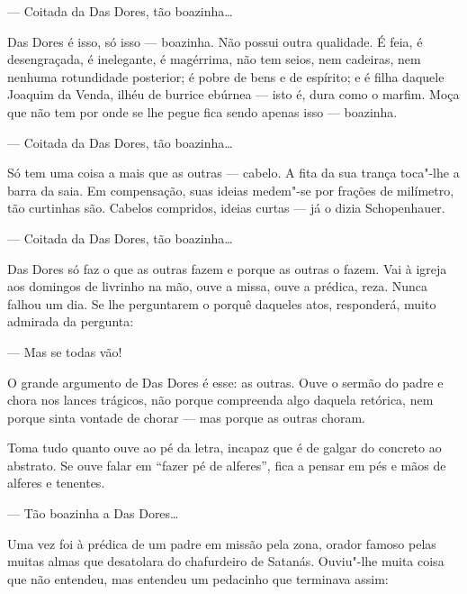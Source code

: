 --- Coitada da Das Dores, tão boazinha\ldots{}

Das Dores é isso, só isso --- boazinha. Não possui outra qualidade. É
feia, é desengraçada, é inelegante, é magérrima, não tem seios, nem
cadeiras, nem nenhuma rotundidade posterior; é pobre de bens e de
espírito; e é filha daquele Joaquim da Venda, ilhéu de burrice ebúrnea
--- isto é, dura como o marfim. Moça que não tem por onde se lhe pegue
fica sendo apenas isso --- boazinha.

--- Coitada da Das Dores, tão boazinha\ldots{}

Só tem uma coisa a mais que as outras --- cabelo. A fita da sua trança
toca"-lhe a barra da saia. Em compensação, suas ideias medem"-se por
frações de milímetro, tão curtinhas são. Cabelos compridos, ideias
curtas --- já o dizia Schopenhauer.


--- Coitada da Das Dores, tão boazinha\ldots{}

Das Dores só faz o que as outras fazem e porque as outras o fazem. Vai à
igreja aos domingos de livrinho na mão, ouve a missa, ouve a prédica,
reza. Nunca falhou um dia. Se lhe perguntarem o porquê daqueles atos,
responderá, muito admirada da pergunta:

--- Mas se todas vão!

O grande argumento de Das Dores é esse: as outras. Ouve o sermão do
padre e chora nos lances trágicos, não porque compreenda algo daquela
retórica, nem porque sinta vontade de chorar --- mas porque as outras
choram.

Toma tudo quanto ouve ao pé da letra, incapaz que é de galgar do
concreto ao abstrato. Se ouve falar em ``fazer pé de alferes'', fica a
pensar em pés e mãos de alferes e tenentes.

--- Tão boazinha a Das Dores\ldots{}

Uma vez foi à prédica de um padre em missão pela zona, orador famoso
pelas muitas almas que desatolara do chafurdeiro de Satanás. Ouviu"-lhe
muita coisa que não entendeu, mas entendeu um pedacinho que terminava
assim:

